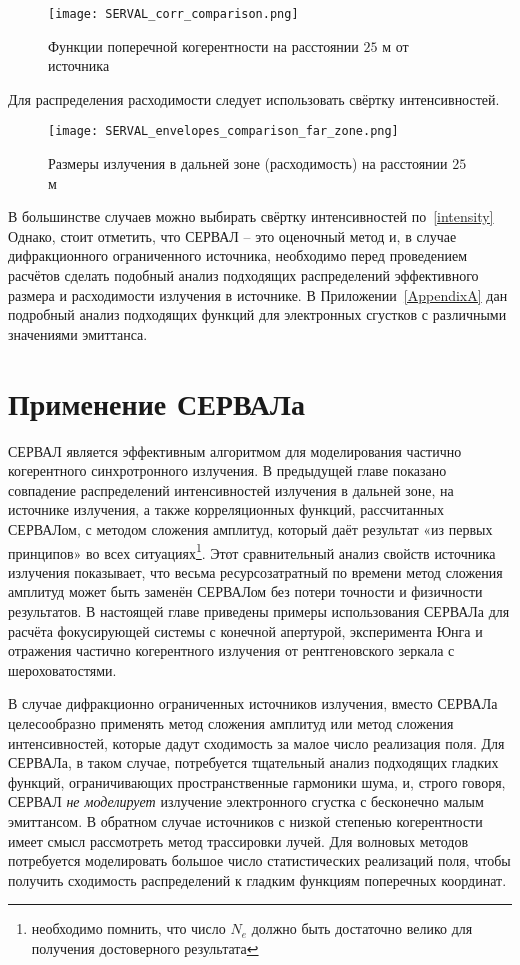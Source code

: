 \begin{figure}[H] 
	\centering 	\texttt{[image: SERVAL\_corr\_comparison.png]}
	\caption{Функции поперечной когерентности на расстоянии $25$ м от источника}
	\label{fig:SERVAL_corr_comparison}
\end{figure}
\noindent Для распределения расходимости следует использовать свёртку интенсивностей.
\begin{figure}[H] 
	\centering 	\texttt{[image: SERVAL\_envelopes\_comparison\_far\_zone.png]}
	\caption{Размеры излучения в дальней зоне (расходимость) на расстоянии $25$ м}
	\label{fig:SERVAL_envelopes_comparison_far_zone}
\end{figure}
В большинстве случаев можно выбирать свёртку интенсивностей по~\ref{intensity} Однако, стоит отметить, что СЕРВАЛ -- это оценочный метод и, в случае дифракционного ограниченного источника, необходимо перед проведением расчётов сделать подобный анализ подходящих распределений эффективного размера и расходимости излучения в источнике. В Приложении~\ref{AppendixA} дан подробный анализ подходящих функций для электронных сгустков с различными значениями эмиттанса.

\chapter{Применение СЕРВАЛа} \label{chapt3}
СЕРВАЛ является эффективным алгоритмом для моделирования частично когерентного синхротронного излучения. В предыдущей главе показано совпадение распределений интенсивностей излучения в дальней зоне, на источнике излучения, а также корреляционных функций, рассчитанных СЕРВАЛом, с методом сложения амплитуд, который даёт результат «из первых принципов» во всех ситуациях\footnote{необходимо помнить, что число $N_e$ должно быть достаточно велико для получения достоверного результата}. Этот сравнительный анализ свойств источника излучения показывает, что весьма ресурсозатратный по времени метод сложения амплитуд может быть заменён СЕРВАЛом без потери точности и физичности результатов. В настоящей главе приведены примеры использования СЕРВАЛа для расчёта фокусирующей системы с конечной апертурой, эксперимента Юнга и отражения частично когерентного излучения от рентгеновского зеркала с шероховатостями. 

В случае дифракционно ограниченных источников излучения, вместо СЕРВАЛа целесообразно применять метод сложения амплитуд или метод сложения интенсивностей, которые дадут сходимость за малое число реализация поля. Для СЕРВАЛа, в таком случае, потребуется тщательный анализ подходящих гладких функций, ограничивающих пространственные гармоники шума, и, строго говоря, СЕРВАЛ \textit{не моделирует} излучение электронного сгустка с бесконечно малым эмиттансом. В обратном случае источников с низкой степенью когерентности имеет смысл рассмотреть метод трассировки лучей. Для волновых методов потребуется моделировать большое число статистических реализаций поля, чтобы получить сходимость распределений к гладким функциям поперечных координат. 

